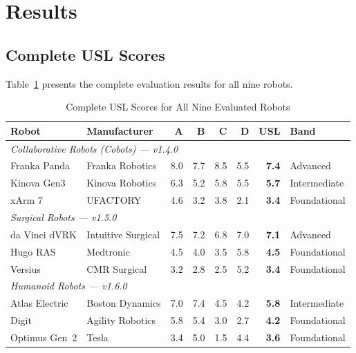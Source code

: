\section{Results}
\label{sec:results}

\subsection{Complete USL Scores}
Table~\ref{tab:allscores} presents the complete evaluation results for all nine robots.

\begin{table}[H]
\centering
\caption{Complete USL Scores for All Nine Evaluated Robots}
\label{tab:allscores}
\small
\begin{tabular}{l l r r r r r l}
\toprule
\textbf{Robot} & \textbf{Manufacturer} & \textbf{A} & \textbf{B} & \textbf{C} & \textbf{D} & \textbf{USL} & \textbf{Band} \\
\midrule
\multicolumn{8}{l}{\textit{Collaborative Robots (Cobots) --- v1.4.0}} \\
Franka Panda & Franka Robotics & 8.0 & 7.7 & 8.5 & 5.5 & \textbf{7.4} & Advanced \\
Kinova Gen3 & Kinova Robotics & 6.3 & 5.2 & 5.8 & 5.5 & \textbf{5.7} & Intermediate \\
xArm 7 & UFACTORY & 4.6 & 3.2 & 3.8 & 2.1 & \textbf{3.4} & Foundational \\
\midrule
\multicolumn{8}{l}{\textit{Surgical Robots --- v1.5.0}} \\
da Vinci dVRK & Intuitive Surgical & 7.5 & 7.2 & 6.8 & 7.0 & \textbf{7.1} & Advanced \\
Hugo RAS & Medtronic & 4.5 & 4.0 & 3.5 & 5.8 & \textbf{4.5} & Foundational \\
Versius & CMR Surgical & 3.2 & 2.8 & 2.5 & 5.2 & \textbf{3.4} & Foundational \\
\midrule
\multicolumn{8}{l}{\textit{Humanoid Robots --- v1.6.0}} \\
Atlas Electric & Boston Dynamics & 7.0 & 7.4 & 4.5 & 4.2 & \textbf{5.8} & Intermediate \\
Digit & Agility Robotics & 5.8 & 5.4 & 3.0 & 2.7 & \textbf{4.2} & Foundational \\
Optimus Gen~2 & Tesla & 3.4 & 5.0 & 1.5 & 4.4 & \textbf{3.6} & Foundational \\
\bottomrule
\end{tabular}
\end{table}

